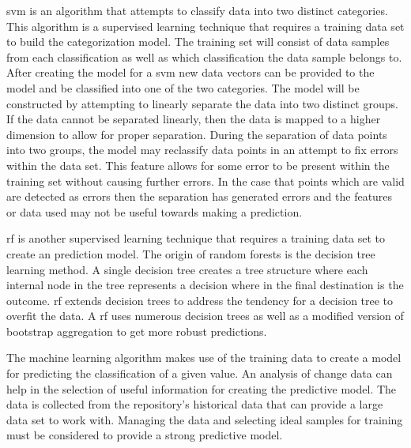 \gls{svm} is an algorithm that attempts to classify data into two distinct categories. This algorithm is a supervised learning technique that requires a training data set to build the categorization model. The training set will consist of data samples from each classification as well as which classification the data sample belongs to. After creating the model for a \gls{svm} new data vectors can be provided to the model and be classified into one of the two categories. The model will be constructed by attempting to linearly separate the data into two distinct groups. If the data cannot be separated linearly, then the data is mapped to a higher dimension to allow for proper separation. During the separation of data points into two groups, the model may reclassify data points in an attempt to fix errors within the data set. This feature allows for some error to be present within the training set without causing further errors. In the case that points which are valid are detected as errors then the separation has generated errors and the features or data used may not be useful towards making a prediction.%

\gls{rf} is another supervised learning technique that requires a training data set to create an prediction model. The origin of random forests is the decision tree learning method. A single decision tree creates a tree structure where each internal node in the tree represents a decision where in the final destination is the outcome. \gls{rf} extends decision trees to address the tendency for a decision tree to overfit the data. A \gls{rf} uses numerous decision trees as well as a modified version of bootstrap aggregation to get more robust predictions.



The machine learning algorithm makes use of the training data to create a model for predicting the classification of a given value. An analysis of change data can help in the selection of useful information for creating the predictive model. The data is collected from the repository's historical data that can provide a large data set to work with. Managing the data and selecting ideal samples for training must be considered to provide a strong predictive model.

